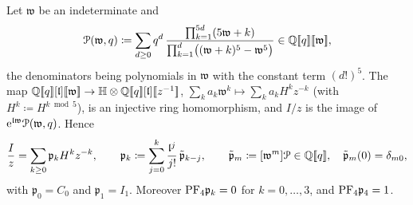 \begin{lem}
\label{lem:set-periods}
Let $\mathfrak w$ be an indeterminate and
\[
\mathcal{P}(\mathfrak w,q)\coloneqq\sum_{d\geq0}q^d\,\frac{\prod_{k=1}^{5d}(5\mathfrak w+k)}{\prod_{k=1}^d\bigl((\mathfrak w+k)^5-\mathfrak w^5\bigr)}\in\mathbb{Q}[\![ q ]\!][\![ \mathfrak w ]\!],
\]
the denominators being polynomials in $\mathfrak w$ with the constant term $(d!)^5$. The map $\bbQ\fps q[\logq]\fps{\mathfrak w}\to\bbH\otimes\bbQ\fps q[\logq]\fps{z^{-1}}$, $\sum_ka_k\mathfrak w^k\mapsto\sum_ka_kH^kz^{-k}$ (with $H^k\coloneqq H^{k\bmod5}$), is an injective ring homomorphism, and $I/z$ is the image of $\mathrm{e}^{\mathfrak{l}\mathfrak w}\mathcal{P}(\mathfrak w,q)$. Hence
\[
\frac Iz=\sum_{k\geq0}\mathfrak p_kH^kz^{-k},\qquad\mathfrak p_k\coloneqq\sum_{j=0}^k\frac{\mathfrak{l}^j}{j!}\,\tilde{\mathfrak p}_{k-j},\qquad\tilde{\mathfrak p}_m\coloneqq[\mathfrak w^m]\mathcal{P}\in\mathbb{Q}[\![ q ]\!],\quad\tilde{\mathfrak p}_m(0)=\delta_{m0},
\]
with $\mathfrak p_0=C_0$ and $\mathfrak p_1=I_1$. Moreover $\mathrm{PF}_{4}\mathfrak p_k=0$ for $k=0,\dots,3$, and $\mathrm{PF}_{4}\mathfrak p_4=1$.
\end{lem}


